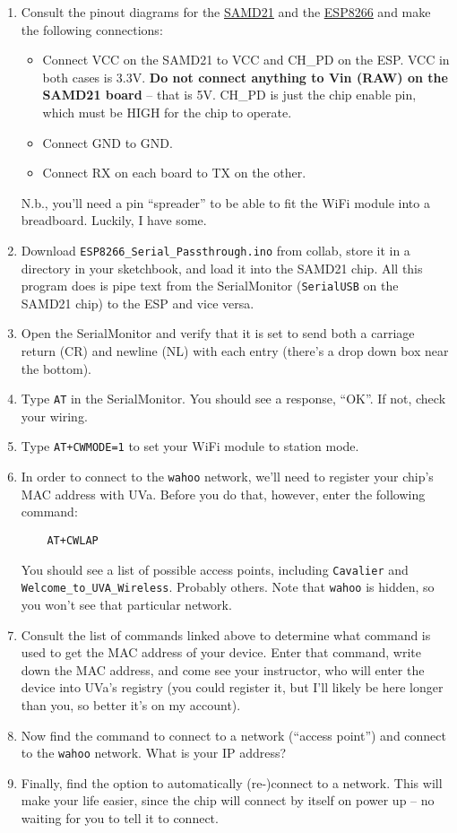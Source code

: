 \documentclass[11pt]{article} %
\begin{document}
\begin{enumerate}
\item Consult the pinout diagrams for the \href{https://cdn.sparkfun.com/assets/learn_tutorials/4/5/4/graphicalDatasheet-Mini.pdf}{\underline{SAMD21}} and the \href{https://cdn.sparkfun.com/datasheets/Wireless/WiFi/ESP8266ModuleV1.pdf}{\underline{ESP8266}} and make the following connections:
\begin{itemize}
\item Connect VCC on the SAMD21 to VCC and CH\_PD on the ESP. VCC in both cases is 3.3V. {\bf Do not connect anything to Vin (RAW) on the SAMD21 board} -- that is 5V. CH\_PD is just the chip enable pin, which must be HIGH for the chip to operate.
\item Connect GND to GND.
\item Connect RX on each board to TX on the other.
\end{itemize}
N.b., you’ll need a pin “spreader” to be able to fit the WiFi module into a breadboard. Luckily, I have some.
\item Download \verb|ESP8266_Serial_Passthrough.ino| from collab, store it in a directory in your sketchbook, and load it into the SAMD21 chip. All this program does is pipe text from the SerialMonitor (\verb|SerialUSB| on the SAMD21 chip) to the ESP and vice versa.
\item Open the SerialMonitor and verify that it is set to send both a carriage return (CR) and newline (NL) with each entry (there’s a drop down box near the bottom).
\item Type \verb|AT| in the SerialMonitor. You should see a response, “OK”. If not, check your wiring.
\item Type \verb|AT+CWMODE=1| to set your WiFi module to station mode.
\item In order to connect to the \verb|wahoo| network, we’ll need to register your chip’s MAC address with UVa. Before you do that, however, enter the following command:

\begin{verbatim}
    AT+CWLAP
\end{verbatim}

You should see a list of possible access points, including \verb|Cavalier| and \verb|Welcome_to_UVA_Wireless|. Probably others. Note that \verb|wahoo| is hidden, so you won’t see that particular network.
\item Consult the list of commands linked above to determine what command is used to get the MAC address of your device. Enter that command, write down the MAC address, and come see your instructor, who will enter the device into UVa’s registry (you could register it, but I’ll likely be here longer than you, so better it’s on my account).
\item Now find the command to connect to a network (“access point”) and connect to the \verb|wahoo| network. What is your IP address?
\item Finally, find the option to automatically (re-)connect to a network. This will make your life easier, since the chip will connect by itself on power up -- no waiting for you to tell it to connect.
\end{enumerate}
\end{document}

